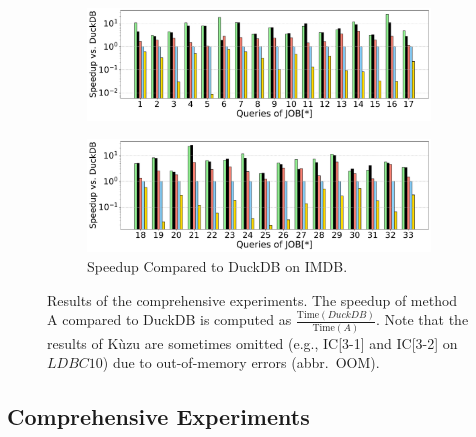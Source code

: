 \begin{figure}[ht]
\begin{subfigure}[b]{\linewidth}
        \centering
        \includegraphics[width=\linewidth]{./figures/exp/e2e_job_part1.pdf}
        \vspace*{-2ex}
    \end{subfigure}
    \begin{subfigure}[b]{\linewidth}
        \centering
        \includegraphics[width=\linewidth]{./figures/exp/e2e_job_part2.pdf}
        \vspace{-2em}
        \caption{Speedup Compared to DuckDB on IMDB.}
        \label{fig:exp-e2e-job}
    \end{subfigure}
    \caption{Results of the comprehensive experiments. The speedup of method A compared to DuckDB is computed as $\frac{\text{Time}(DuckDB)}{\text{Time}(A)}$. Note that the results of Kùzu are sometimes omitted (e.g., IC[3-1] and IC[3-2] on $LDBC10$) due to out-of-memory errors (abbr.~OOM).}
    \label{fig:exp-e2e}
\end{figure}

\subsection{Comprehensive Experiments}
\label{sec:experiment-e2e}


